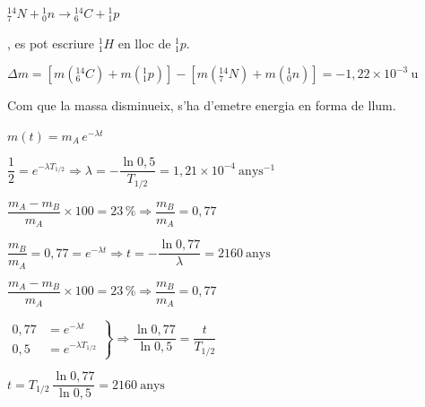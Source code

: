 \begin{solapartat}
 $^{14}_{7}N + {}^{1}_{0}n \rightarrow {}^{14}_{6}C + {}^{1}_{1}p$

, es pot escriure $^{1}_{1}H$ en lloc de $^{1}_{1}p$.

 $\Delta m = \left[m({}^{14}_{6}C) + m({}^{1}_{1}p)\right] - \left[m({}^{14}_{7}N) + m({}^{1}_{0}n)\right] = -1,22\times 10^{-3}\ \mathrm{u}$

Com que la massa disminueix, s'ha d'emetre energia en forma de llum.
\end{solapartat}

\begin{solapartat}
 $m(t) = m_A\,e^{-\lambda t}$

 $\dfrac{1}{2} = e^{-\lambda T_{1/2}} \Longrightarrow \lambda = -\dfrac{\ln 0,5}{T_{1/2}} = 1,21\times 10^{-4}\ \mathrm{anys^{-1}}$

 $\dfrac{m_A - m_B}{m_A}\times 100 = 23\,\% \Longrightarrow \dfrac{m_B}{m_A} = 0,77$

 $\dfrac{m_B}{m_A} = 0,77 = e^{-\lambda t} \Longrightarrow t = -\dfrac{\ln 0,77}{\lambda} = 2160\ \mathrm{anys}$


 $\dfrac{m_A - m_B}{m_A}\times 100 = 23\,\% \Longrightarrow \dfrac{m_B}{m_A} = 0,77$

 $\left.\begin{aligned} 0,77 &= e^{-\lambda t}\\ 0,5 &= e^{-\lambda T_{1/2}} \end{aligned}\right\} \Longrightarrow \dfrac{\ln 0,77}{\ln 0,5} = \dfrac{t}{T_{1/2}}$

 $t = T_{1/2}\,\dfrac{\ln 0,77}{\ln 0,5} = 2160\ \mathrm{anys}$
\end{solapartat}
